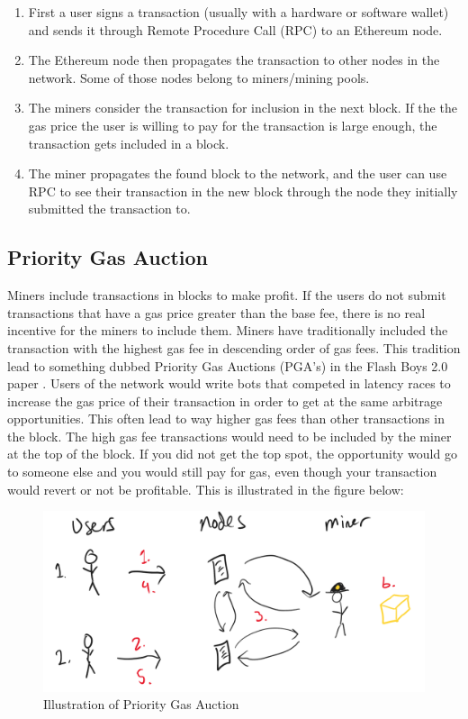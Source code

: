 \begin{enumerate}
    \item First a user signs a transaction (usually with a hardware or software wallet) and sends it through Remote Procedure Call (RPC) to an Ethereum node.
    \item The Ethereum node then propagates the transaction to other nodes in the network. Some of those nodes belong to miners/mining pools.
    \item The miners consider the transaction for inclusion in the next block. If the the gas price the user is willing to pay for the transaction is large enough, the transaction gets included in a block.
    \item The miner propagates the found block to the network, and the user can use RPC to see their transaction in the new block through the node they initially submitted the transaction to.
\end{enumerate}


\subsection{Priority Gas Auction}

Miners include transactions in blocks to make profit. If the users do not submit transactions that have a gas price greater than the base fee, there is no real incentive for the miners to include them. Miners have traditionally included the transaction with the highest gas fee in descending order of gas fees. This tradition lead to something dubbed Priority Gas Auctions (PGA's) in the Flash Boys 2.0 paper \cite{flashboys2.0}. Users of the network would write bots that competed in latency races to increase the gas price of their transaction in order to get at the same arbitrage opportunities. This often lead to way higher gas fees than other transactions in the block. The high gas fee transactions would need to be included by the miner at the top of the block. If you did not get the top spot, the opportunity would go to someone else and you would still pay for gas, even though your transaction would revert or not be profitable. This is illustrated in the figure below:

\begin{figure}[H]
    \centering
    \includegraphics[width=\textwidth]{3_FIGURES/Theory/PGA.PNG}
    \caption{Illustration of Priority Gas Auction}
    \label{PGA}
\end{figure}

